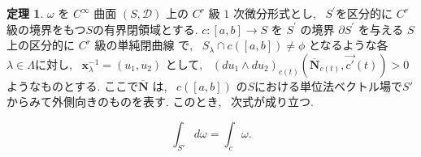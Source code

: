 \documentclass[12pt,a4j,final]{jreport}
\theoremstyle{definition}
\newtheorem{Thm}{定理}[section]
\begin{document}
\begin{Thm}\label{Koike2.7.1}
  $\omega$ を $C^{\infty}$ 曲面 $(S, \mathcal{D})$ 上の $C^{r}$ 級 $1$ 次微分形式とし, \ 
$S^{\prime}$を区分的に $C^{r}$ 級の境界をもつ$S$の有界閉領域とする.
$c:[a, b] \rightarrow S$ を $S^{\prime}$ の境界 $\partial S^{\prime}$ を与える $S$ 上の区分的に $C^r$ 級の単純閉曲線
で, \ $S_{\lambda} \cap c([a, b]) \neq \phi$ となるような各$\lambda \in \Lambda$に対し, \
$\boldsymbol{x}_{\lambda}^{-1}=\left(u_{1}, u_{2}\right)$ として, \  $\left(d u_{1} \wedge d u_{2}\right)_{c(t)} \left(\overline{\boldsymbol{N}}_{c(t)}, \vec{c'}(t)\right)>0$
ようなものとする.
ここで$\overline{\boldsymbol{N}}$ は, \ $c([a, b])$ の$S$における単位法ベクトル場で$S'$からみて外側向きのものを表す. このとき, \ 次式が成り立つ.

$$
\displaystyle \int_{S'} d\omega = \int_c \omega.
$$

\end{Thm}
\end{document}
